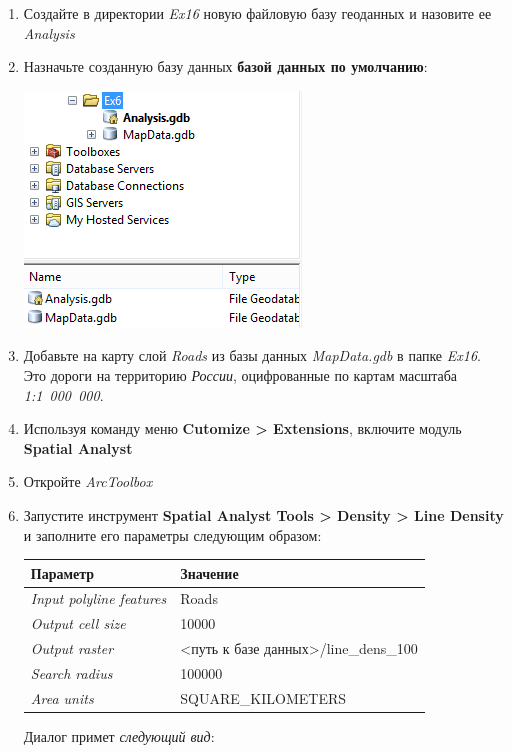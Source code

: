 \documentclass[]{book}
\theoremstyle{definition}
\theoremstyle{definition}
\theoremstyle{definition}
\theoremstyle{remark}
\begin{document}
\begin{enumerate}
\def\labelenumi{\arabic{enumi}.}
\item
  Создайте в директории \emph{Ex16} новую файловую базу геоданных и
  назовите ее \emph{Analysis}
\item
  Назначьте созданную базу данных \textbf{базой данных по умолчанию}:

  \includegraphics{images/Ex16/image5.png}
\item
  Добавьте на карту слой \emph{Roads} из базы данных \emph{MapData.gdb}
  в папке \emph{Ex16}. Это дороги на территорию \emph{России},
  оцифрованные по картам масштаба \emph{1:1~000~000}.
\item
  Используя команду меню \textbf{Cutomize \textgreater{} Extensions},
  включите модуль \textbf{Spatial Analyst}
\item
  Откройте \emph{ArcToolbox}
\item
  Запустите инструмент \textbf{Spatial Analyst Tools \textgreater{}
  Density \textgreater{} Line Density} и заполните его параметры
  следующим образом:

  \begin{longtable}[]{@{}ll@{}}
  \toprule
  Параметр & Значение\tabularnewline
  \midrule
  \endhead
  \emph{Input polyline features} & Roads\tabularnewline
  \emph{Output cell size} & 10000\tabularnewline
  \emph{Output raster} & \textless{}путь к базе
  данных\textgreater{}/line\_dens\_100\tabularnewline
  \emph{Search radius} & 100000\tabularnewline
  \emph{Area units} & SQUARE\_KILOMETERS\tabularnewline
  \bottomrule
  \end{longtable}

  Диалог примет \emph{следующий вид}:


\end{enumerate}
\end{document}

